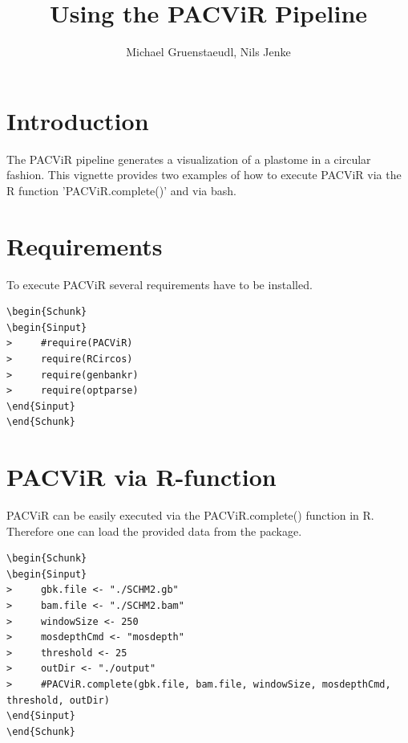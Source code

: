 \documentclass[letterpaper]{article}
\author{Michael Gruenstaeudl, Nils Jenke}
\title{Using the PACViR Pipeline}
\begin{document}



\maketitle

\tableofcontents

\section{Introduction}

  The PACViR pipeline generates a visualization of a plastome in a circular fashion. This vignette provides two examples of   how to execute PACViR via the R function 'PACViR.complete()' and via bash.

\section{Requirements}

  To execute PACViR several requirements have to be installed.


  \begin{footnotesize}
  \begin{lstlisting}[linerange=\\begin\{Sinput\}-\\end\{Sinput\},includerangemarker=false]
\begin{Schunk}
\begin{Sinput}
>     #require(PACViR)
>     require(RCircos)
>     require(genbankr)
>     require(optparse)
\end{Sinput}
\end{Schunk}
  \end{lstlisting}
  \end{footnotesize}


\section{PACViR via R-function }

  PACViR can be easily executed via the PACViR.complete() function in R. Therefore one can load the provided data from the   package.

  \begin{footnotesize}
  \begin{lstlisting}[linerange=\\begin\{Sinput\}-\\end\{Sinput\},includerangemarker=false]
\begin{Schunk}
\begin{Sinput}
>     gbk.file <- "./SCHM2.gb"
>     bam.file <- "./SCHM2.bam"
>     windowSize <- 250
>     mosdepthCmd <- "mosdepth"
>     threshold <- 25 
>     outDir <- "./output"
>     #PACViR.complete(gbk.file, bam.file, windowSize, mosdepthCmd, threshold, outDir)
\end{Sinput}
\end{Schunk}
  \end{lstlisting}
  \end{footnotesize}
  
\end{document}
